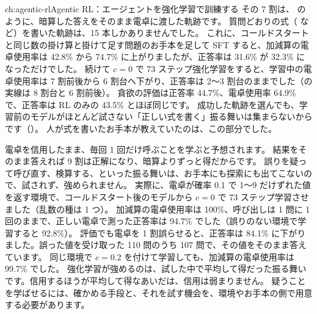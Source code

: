 \begin{answers}{ch:agentic-rl}{Agentic RL：エージェントを強化学習で訓練する}
その 7 割は、 のように、暗算した答えをそのまま電卓に渡した軌跡です。
質問どおりの式（ など）を書いた軌跡は、15 本しかありませんでした。
これに、コールドスタートと同じ数の掛け算と掛けて足す問題のお手本を足して SFT すると、加減算の電卓使用率は 42.8\% から 74.7\% に上がりましたが、正答率は 31.6\% が 32.3\% になっただけでした。
続けて $c=0$ で 73 ステップ強化学習をすると、学習中の電卓使用率は 7 割前後から 6 割台へ下がり、正答率は 2〜3 割台のままでした（の実線は 8 割台と 6 割前後）。
貪欲の評価は正答率 44.7\%、電卓使用率 64.9\% で、正答率は RL のみの 43.5\% とほぼ同じです。
成功した軌跡を選んでも、学習前のモデルがほとんど試さない「正しい式を書く」振る舞いは集まらないからです（）。
人が式を書いたお手本が教えていたのは、この部分でした。
\item 電卓を信用したまま、毎回 1 回だけ呼ぶことを学ぶと予想されます。
結果をそのまま答えれば 9 割は正解になり、暗算よりずっと得だからです。
誤りを疑って呼び直す、検算する、といった振る舞いは、お手本にも探索にも出てこないので、試されず、強められません。
実際に、電卓が確率 0.1 で 1〜9 だけずれた値を返す環境で、コールドスタート後のモデルから $c=0$ で 73 ステップ学習させました（乱数の種は 1 つ）。
加減算の電卓使用率は 100\%、呼び出しは 1 問に 1 回のままで、正しい電卓で測った正答率は 94.7\% でした（誤りのない環境で学習すると 92.8\%）。
評価でも電卓を 1 割誤らせると、正答率は 84.1\% に下がりました。誤った値を受け取った 110 問のうち 107 問で、その値をそのまま答えています。
同じ環境で $c=0.2$ を付けて学習しても、加減算の電卓使用率は 99.7\% でした。
強化学習が強めるのは、試した中で平均して得だった振る舞いです。信用するほうが平均して得なあいだは、信用は弱まりません。
疑うことを学ばせるには、確かめる手段と、それを試す機会を、環境やお手本の側で用意する必要があります。
\end{answers}

